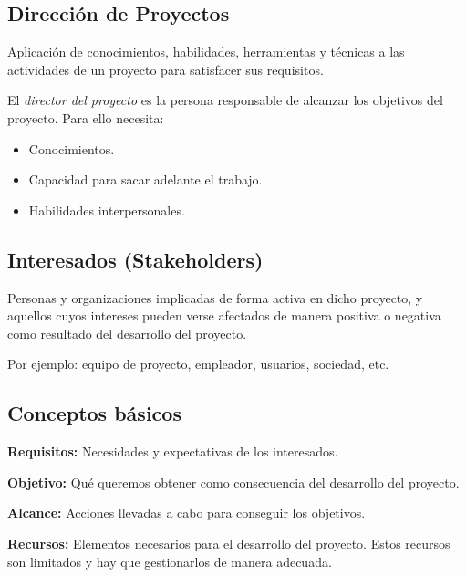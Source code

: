 \documentclass{article}
\begin{document}
\subsection{Dirección de Proyectos}
\begin{theorem}
Aplicación de conocimientos, habilidades, herramientas y técnicas a las actividades de un proyecto para satisfacer sus requisitos.
\end{theorem}
El \textit{director del proyecto} es la persona responsable de alcanzar los objetivos del proyecto. Para ello necesita:
\begin{itemize}
	\item Conocimientos.
	\item Capacidad para sacar adelante el trabajo.
	\item Habilidades interpersonales.
\end{itemize}

\subsection{Interesados (Stakeholders)}
\begin{theorem}
Personas y organizaciones implicadas de forma activa en dicho proyecto, y aquellos cuyos intereses pueden verse afectados de manera positiva o negativa como resultado del desarrollo del proyecto. 
\end{theorem}
Por ejemplo: equipo de proyecto, empleador, usuarios, sociedad, etc.

\subsection{Conceptos básicos}
\begin{theorem}
\textbf{Requisitos:} Necesidades y expectativas de los interesados.
\end{theorem}

\begin{theorem}
\textbf{Objetivo: } Qué queremos obtener como consecuencia del desarrollo del proyecto.
\end{theorem}

\begin{theorem}
\textbf{Alcance: }Acciones llevadas a cabo para conseguir los objetivos.
\end{theorem}

\begin{theorem}
\textbf{Recursos: } Elementos necesarios para el desarrollo del proyecto. Estos recursos son limitados y hay que gestionarlos de manera adecuada.
\end{theorem}
\end{document}

